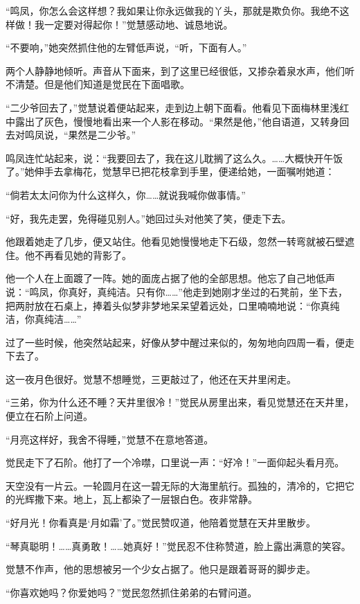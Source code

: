 \par “鸣凤，你怎么会这样想？我如果让你永远做我的丫头，那就是欺负你。我绝不这样做！我一定要对得起你！”觉慧感动地、诚恳地说。
\par “不要响，”她突然抓住他的左臂低声说，“听，下面有人。”
\par 两个人静静地倾听。声音从下面来，到了这里已经很低，又掺杂着泉水声，他们听不清楚。但是他们知道是觉民在下面唱歌。
\par “二少爷回去了，”觉慧说着便站起来，走到边上朝下面看。他看见下面梅林里浅红中露出了灰色，慢慢地看出来一个人影在移动。“果然是他，”他自语道，又转身回去对鸣凤说，“果然是二少爷。”
\par 鸣凤连忙站起来，说：“我要回去了，我在这儿耽搁了这么久。……大概快开午饭了。”她伸手去拿梅花，觉慧早已把花枝拿到手里，便递给她，一面嘱咐她道：
\par “倘若太太问你为什么这样久，你……就说我喊你做事情。”
\par “好，我先走罢，免得碰见别人。”她回过头对他笑了笑，便走下去。
\par 他跟着她走了几步，便又站住。他看见她慢慢地走下石级，忽然一转弯就被石壁遮住。他不再看见她的背影了。
\par 他一个人在上面踱了一阵。她的面庞占据了他的全部思想。他忘了自己地低声说：“鸣凤，你真好，真纯洁。只有你……”他走到她刚才坐过的石凳前，坐下去，把两肘放在石桌上，捧着头似梦非梦地呆呆望着远处，口里喃喃地说：“你真纯洁，你真纯洁……”
\par 过了一些时候，他突然站起来，好像从梦中醒过来似的，匆匆地向四周一看，便走下去了。
\par 这一夜月色很好。觉慧不想睡觉，三更敲过了，他还在天井里闲走。
\par “三弟，你为什么还不睡？天井里很冷！”觉民从房里出来，看见觉慧还在天井里，便立在石阶上问道。
\par “月亮这样好，我舍不得睡，”觉慧不在意地答道。
\par 觉民走下了石阶。他打了一个冷噤，口里说一声：“好冷！”一面仰起头看月亮。
\par 天空没有一片云。一轮圆月在这一碧无际的大海里航行。孤独的，清冷的，它把它的光辉撒下来。地上，瓦上都染了一层银白色。夜非常静。
\par “好月光！你看真是‘月如霜’了。”觉民赞叹道，他陪着觉慧在天井里散步。
\par “琴真聪明！……真勇敢！……她真好！”觉民忍不住称赞道，脸上露出满意的笑容。
\par 觉慧不作声，他的思想被另一个少女占据了。他只是跟着哥哥的脚步走。
\par “你喜欢她吗？你爱她吗？”觉民忽然抓住弟弟的右臂问道。
